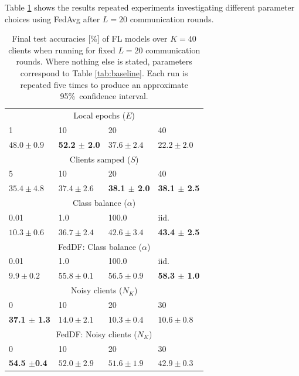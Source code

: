 \documentclass{article}
\begin{document}
Table \ref{tab:main} shows the results repeated experiments investigating different parameter choices using FedAvg after $L=20$ communication rounds.
\begin{table}[htb!]
    \centering
    \begin{tabular}{llll}
       \hline
        \multicolumn{4}{c}{Local epochs ($E$)}\\
        1 & 10 & 20 & 40 \\
       \hline
$48.0 \pm 0.9$ & \textbf{ 52.2 $\pm$ 2.0 } & $37.6 \pm 2.4$ & $22.2 \pm 2.0$ \\
        \multicolumn{4}{c}{Clients samped ($S$)}\\
        5 & 10 & 20 & 40 \\
       \hline
        $35.4 \pm 4.8$ & $37.4 \pm 2.6$ & \textbf{ 38.1 $\pm$ 2.0 } & \textbf{ 38.1 $\pm$ 2.5 } \\
        \multicolumn{4}{c}{Class balance ($\alpha$)}\\
        0.01 & 1.0 & 100.0 & iid. \\
       \hline
        $10.3 \pm 0.6$ & $36.7 \pm 2.4$ & $42.6 \pm 3.4$ & \textbf{ 43.4 $\pm$ 2.5  }\\
        \multicolumn{4}{c}{FedDF: Class balance ($\alpha$)}\\
        0.01 & 1.0 & 100.0 & iid. \\
       \hline
        $9.9 \pm 0.2$ & $55.8 \pm 0.1$ & $56.5 \pm 0.9$ & \textbf{ 58.3 $\pm$ 1.0 } \\
        \multicolumn{4}{c}{Noisy clients ($N_K$)}\\
        0 & 10 & 20 & 30 \\
       \hline
        \textbf{ 37.1 $\pm$ 1.3 } & $14.0 \pm 2.1$ & $10.3 \pm 0.4$ & $10.6 \pm 0.8$ \\
        \multicolumn{4}{c}{FedDF: Noisy clients ($N_K$)}\\
        0 & 10 & 20 & 30 \\
       \hline
        \textbf{ 54.5 $\pm $0.4 } & $52.0 \pm 2.9$ & $51.6 \pm 1.9$ & $42.9 \pm 0.3$ \\
\end{tabular}
    \caption{
    Final test accuracies [\%] of FL models over $K=40$ clients when running for fixed $L=20$ communication rounds.
    Where nothing else is stated, parameters correspond to Table \ref{tab:baseline}.
    Each run is repeated five times to produce an approximate 95\%\ confidence interval.
    }
    \label{tab:main}
\end{table}
\end{document}
